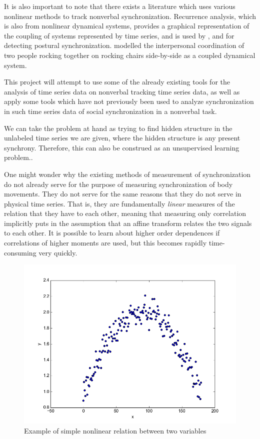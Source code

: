 \documentclass[12pt]{article}
\begin{document}
It is also important to note that there exists a literature which uses various nonlinear methods to track nonverbal synchronization. Recurrence analysis, which is also from nonlinear dynamical systems, provides a graphical representation of the coupling of systems represented by time series, and is used by \cite{webber}, \cite{musicians} and \cite{puzzles} for detecting postural synchronization. \cite{richardson} modelled the interpersonal coordination of two people rocking together on rocking chairs side-by-side as a coupled dynamical system.

This project will attempt to use some of the already existing tools for the analysis of time series data on nonverbal tracking time series data, as well as apply some tools which have not previously been used to analyze synchronization in such time series data of social synchronization in a nonverbal task.

We can take the problem at hand as trying to find hidden structure in the unlabeled time series we are given, where the hidden structure is any present synchrony. Therefore, this can also be construed as an unsupervised learning problem.\cite{socialsync}.

One might wonder why the existing methods of measurement of synchronization do not already serve for the purpose of measuring synchronization of body movements. They do not serve for the same reasons that they do not serve in physical time series. That is, they are fundamentally \emph{linear} measures of the relation that they have to each other, meaning that measuring only correlation implicitly puts in the assumption that an affine transform relates the two signals to each other. It is possible to learn about higher order dependences if correlations of higher moments are used, but this becomes rapidly time-consuming very quickly\cite{pompe}.

\begin{figure}\label{fig:nonlinearity}
  \begin{center}
    \includegraphics[scale=0.5]{mi_ex}
  \end{center}
  \caption{Example of simple nonlinear relation between two variables}
\end{figure}
\end{document}
